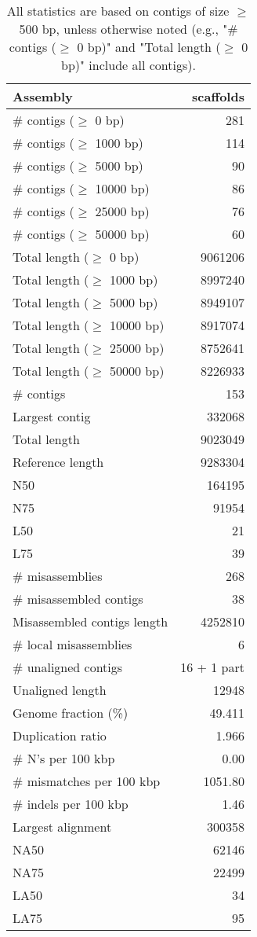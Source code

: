 \documentclass[12pt,a4paper]{article}
\begin{document}
\begin{table}[ht]
\begin{center}
\caption{All statistics are based on contigs of size $\geq$ 500 bp, unless otherwise noted (e.g., "\# contigs ($\geq$ 0 bp)" and "Total length ($\geq$ 0 bp)" include all contigs).}
\begin{tabular}{|l*{1}{|r}|}
\hline
Assembly & scaffolds \\ \hline
\# contigs ($\geq$ 0 bp) & 281 \\ \hline
\# contigs ($\geq$ 1000 bp) & 114 \\ \hline
\# contigs ($\geq$ 5000 bp) & 90 \\ \hline
\# contigs ($\geq$ 10000 bp) & 86 \\ \hline
\# contigs ($\geq$ 25000 bp) & 76 \\ \hline
\# contigs ($\geq$ 50000 bp) & 60 \\ \hline
Total length ($\geq$ 0 bp) & 9061206 \\ \hline
Total length ($\geq$ 1000 bp) & 8997240 \\ \hline
Total length ($\geq$ 5000 bp) & 8949107 \\ \hline
Total length ($\geq$ 10000 bp) & 8917074 \\ \hline
Total length ($\geq$ 25000 bp) & 8752641 \\ \hline
Total length ($\geq$ 50000 bp) & 8226933 \\ \hline
\# contigs & 153 \\ \hline
Largest contig & 332068 \\ \hline
Total length & 9023049 \\ \hline
Reference length & 9283304 \\ \hline
N50 & 164195 \\ \hline
N75 & 91954 \\ \hline
L50 & 21 \\ \hline
L75 & 39 \\ \hline
\# misassemblies & 268 \\ \hline
\# misassembled contigs & 38 \\ \hline
Misassembled contigs length & 4252810 \\ \hline
\# local misassemblies & 6 \\ \hline
\# unaligned contigs & 16 + 1 part \\ \hline
Unaligned length & 12948 \\ \hline
Genome fraction (\%) & 49.411 \\ \hline
Duplication ratio & 1.966 \\ \hline
\# N's per 100 kbp & 0.00 \\ \hline
\# mismatches per 100 kbp & 1051.80 \\ \hline
\# indels per 100 kbp & 1.46 \\ \hline
Largest alignment & 300358 \\ \hline
NA50 & 62146 \\ \hline
NA75 & 22499 \\ \hline
LA50 & 34 \\ \hline
LA75 & 95 \\ \hline
\end{tabular}
\end{center}
\end{table}
\end{document}
